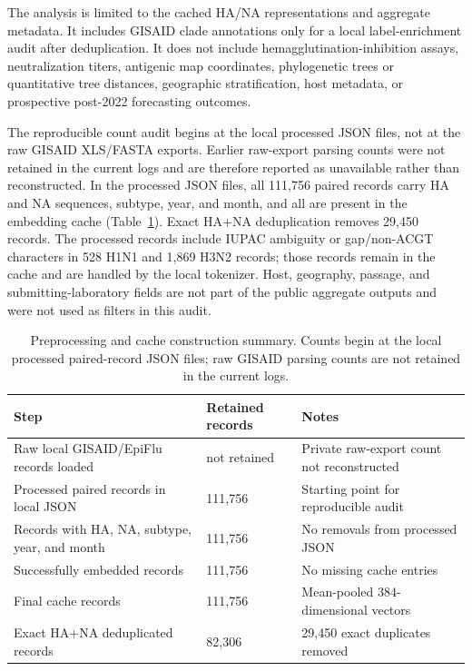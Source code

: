 \documentclass[11pt]{article}
\begin{document}
The analysis is limited to the cached HA/NA representations and aggregate metadata. It includes GISAID clade annotations only for a local label-enrichment audit after deduplication. It does not include hemagglutination-inhibition assays, neutralization titers, antigenic map coordinates, phylogenetic trees or quantitative tree distances, geographic stratification, host metadata, or prospective post-2022 forecasting outcomes.

The reproducible count audit begins at the local processed  JSON files, not at the raw GISAID XLS/FASTA exports. Earlier raw-export parsing counts were not retained in the current logs and are therefore reported as unavailable rather than reconstructed. In the processed JSON files, all 111,756 paired records carry HA and NA sequences, subtype, year, and month, and all are present in the embedding cache (Table~\ref{tab:preprocessing-counts}). Exact HA+NA deduplication removes 29,450 records. The processed records include IUPAC ambiguity or gap/non-ACGT characters in 528 H1N1 and 1,869 H3N2 records; those records remain in the cache and are handled by the local tokenizer. Host, geography, passage, and submitting-laboratory fields are not part of the public aggregate outputs and were not used as filters in this audit.

\begin{table}[H]
\centering
\caption{Preprocessing and cache construction summary. Counts begin at the local processed paired-record JSON files; raw GISAID parsing counts are not retained in the current logs.}
\label{tab:preprocessing-counts}
\begin{tabular}{p{}p{}p{}}
\toprule
Step & Retained records & Notes \\
\midrule
Raw local GISAID/EpiFlu records loaded & not retained & Private raw-export count not reconstructed \\
Processed paired records in local JSON & 111,756 & Starting point for reproducible audit \\
Records with HA, NA, subtype, year, and month & 111,756 & No removals from processed JSON \\
Successfully embedded records & 111,756 & No missing cache entries \\
Final cache records & 111,756 & Mean-pooled 384-dimensional vectors \\
Exact HA+NA deduplicated records & 82,306 & 29,450 exact duplicates removed \\
\bottomrule
\end{tabular}
\end{table}
\end{document}
